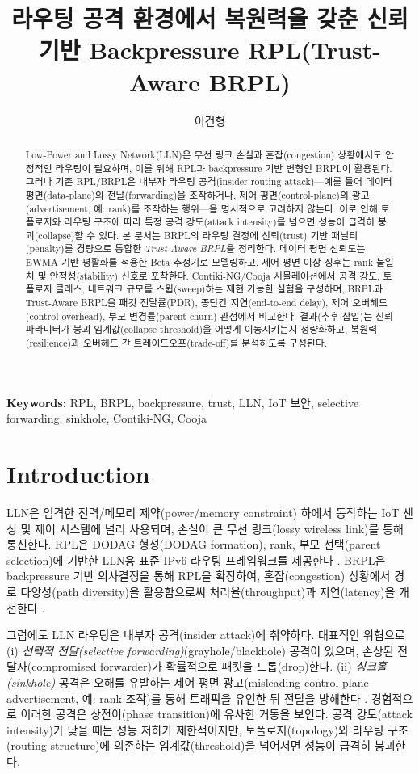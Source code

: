 \documentclass[11pt,a4paper]{article}
\title{라우팅 공격 환경에서 복원력을 갖춘 신뢰 기반 Backpressure RPL(Trust-Aware BRPL)}
\author{이건형}
\date{}
\begin{document}
\maketitle

\begin{abstract}
Low-Power and Lossy Network(LLN)은 무선 링크 손실과 혼잡(congestion) 상황에서도 안정적인 라우팅이 필요하며, 이를 위해 RPL과 backpressure 기반 변형인 BRPL이 활용된다. 그러나 기존 RPL/BRPL은 내부자 라우팅 공격(insider routing attack)—예를 들어 데이터 평면(data-plane)의 전달(forwarding)을 조작하거나, 제어 평면(control-plane)의 광고(advertisement, 예: rank)를 조작하는 행위—을 명시적으로 고려하지 않는다. 이로 인해 토폴로지와 라우팅 구조에 따라 특정 공격 강도(attack intensity)를 넘으면 성능이 급격히 붕괴(collapse)할 수 있다. 본 문서는 BRPL의 라우팅 결정에 신뢰(trust) 기반 패널티(penalty)를 경량으로 통합한 \emph{Trust-Aware BRPL}을 정리한다. 데이터 평면 신뢰도는 EWMA 기반 평활화를 적용한 Beta 추정기로 모델링하고, 제어 평면 이상 징후는 rank 불일치 및 안정성(stability) 신호로 포착한다. Contiki-NG/Cooja 시뮬레이션에서 공격 강도, 토폴로지 클래스, 네트워크 규모를 스윕(sweep)하는 재현 가능한 실험을 구성하며, BRPL과 Trust-Aware BRPL을 패킷 전달률(PDR), 종단간 지연(end-to-end delay), 제어 오버헤드(control overhead), 부모 변경률(parent churn) 관점에서 비교한다. 결과(추후 삽입)는 신뢰 파라미터가 붕괴 임계값(collapse threshold)을 어떻게 이동시키는지 정량화하고, 복원력(resilience)과 오버헤드 간 트레이드오프(trade-off)를 분석하도록 구성된다.
\end{abstract}

\noindent\textbf{Keywords:} RPL, BRPL, backpressure, trust, LLN, IoT 보안, selective forwarding, sinkhole, Contiki-NG, Cooja

\section{Introduction}
\label{sec:intro}
LLN은 엄격한 전력/메모리 제약(power/memory constraint) 하에서 동작하는 IoT 센싱 및 제어 시스템에 널리 사용되며, 손실이 큰 무선 링크(lossy wireless link)를 통해 통신한다. RPL은 DODAG 형성(DODAG formation), rank, 부모 선택(parent selection)에 기반한 LLN용 표준 IPv6 라우팅 프레임워크를 제공한다 \citep{rfc6550}. BRPL은 backpressure 기반 의사결정을 통해 RPL을 확장하여, 혼잡(congestion) 상황에서 경로 다양성(path diversity)을 활용함으로써 처리율(throughput)과 지연(latency)을 개선한다 \citep{moeller2016brpl}.

그럼에도 LLN 라우팅은 내부자 공격(insider attack)에 취약하다. 대표적인 위협으로 (i) \emph{선택적 전달(selective forwarding)}(grayhole/blackhole) 공격이 있으며, 손상된 전달자(compromised forwarder)가 확률적으로 패킷을 드롭(drop)한다. (ii) \emph{싱크홀(sinkhole)} 공격은 오해를 유발하는 제어 평면 광고(misleading control-plane advertisement, 예: rank 조작)를 통해 트래픽을 유인한 뒤 전달을 방해한다 \citep{karlof2003secure,wood2002dos,le2013rank,mayzaud2016taxonomy}. 경험적으로 이러한 공격은 상전이(phase transition)에 유사한 거동을 보인다. 공격 강도(attack intensity)가 낮을 때는 성능 저하가 제한적이지만, 토폴로지(topology)와 라우팅 구조(routing structure)에 의존하는 임계값(threshold)을 넘어서면 성능이 급격히 붕괴한다.
\end{document}
